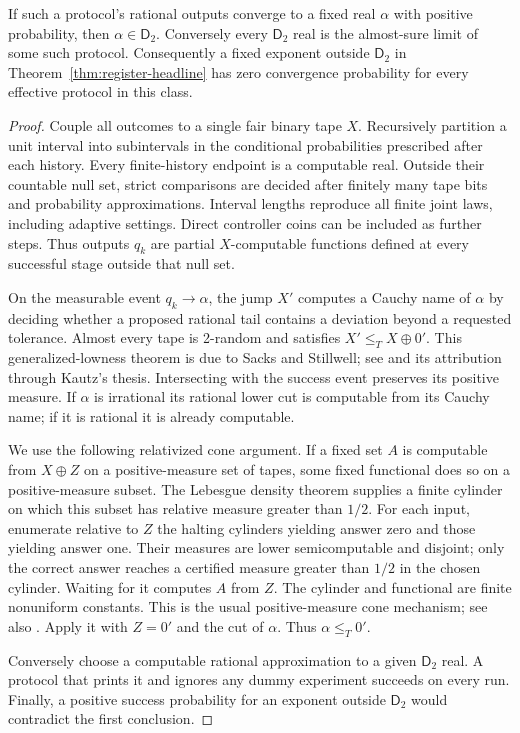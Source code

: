 \begin{theorem}\label{thm:reach}
If such a protocol's rational outputs converge to a fixed real
$\alpha$ with positive probability, then $\alpha\in\mathsf D_2$.
Conversely every $\mathsf D_2$ real is the almost-sure limit of
some such protocol. Consequently a fixed exponent outside
$\mathsf D_2$ in Theorem~\ref{thm:register-headline} has zero
convergence probability for every effective protocol in this class.
\end{theorem}
\begin{proof}
Couple all outcomes to a single fair binary tape $X$. Recursively
partition a unit interval into subintervals in the conditional
probabilities prescribed after each history. Every finite-history
endpoint is a computable real. Outside their countable null set,
strict comparisons are decided after finitely many tape bits and
probability approximations. Interval lengths reproduce all finite
joint laws, including adaptive settings. Direct controller coins
can be included as further steps. Thus outputs $q_k$ are partial
$X$-computable functions defined at every successful stage outside
that null set.

On the measurable event $q_k\to\alpha$, the jump $X'$ computes a
Cauchy name of $\alpha$ by deciding whether a proposed rational tail
contains a deviation beyond a requested tolerance. Almost every
tape is 2-random and satisfies $X'\leq_T X\oplus0'$.
This generalized-lowness theorem is due to Sacks and Stillwell;
see \cite[Corollary~3.12]{randomDegrees} and its attribution through
Kautz's thesis. Intersecting with the success event preserves its
positive measure. If $\alpha$ is irrational its rational lower cut
is computable from its Cauchy name; if it is rational it is already
computable.

We use the following relativized cone argument. If a fixed set $A$
is computable from $X\oplus Z$ on a positive-measure set of tapes,
some fixed functional does so on a positive-measure subset. The
Lebesgue density theorem supplies a finite cylinder on which this
subset has relative measure greater than $1/2$. For each input,
enumerate relative to $Z$ the halting cylinders yielding answer
zero and those yielding answer one. Their measures are lower
semicomputable and disjoint; only the correct answer reaches a
certified measure greater than $1/2$ in the chosen cylinder. Waiting
for it computes $A$ from $Z$. The cylinder and functional are finite
nonuniform constants. This is the usual positive-measure cone
mechanism; see also \cite{probabilisticChoice}. Apply it with
$Z=0'$ and the cut of $\alpha$. Thus $\alpha\leq_T0'$.

Conversely choose a computable rational approximation to a given
$\mathsf D_2$ real. A protocol that prints it and ignores any dummy
experiment succeeds on every run. Finally, a positive success
probability for an exponent outside $\mathsf D_2$ would contradict
the first conclusion.
\end{proof}
